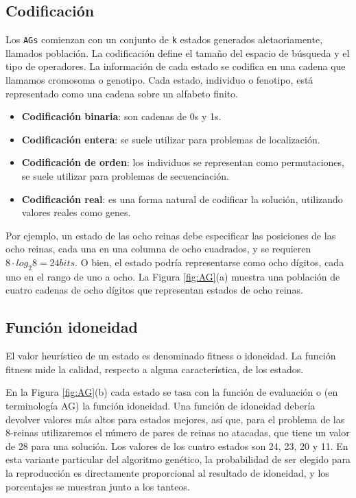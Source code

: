 	\subsection{Codificación}
	\par Los \texttt{AGs} comienzan con un conjunto de \texttt{k} estados generados aletaoriamente, llamados población. 
	La codificación define el tamaño del espacio de búsqueda y el tipo de operadores. La información de cada
	estado se codifica en una cadena que llamamos cromosoma o genotipo. 
	Cada estado, individuo o fenotipo, está representado como una cadena sobre un alfabeto finito. 
	\newpage
	\begin{itemize}
		\item \textbf{Codificación binaria}: son cadenas de 0s y 1s.
		\item \textbf{Codificación entera}: se suele utilizar para problemas de localización.
		\item \textbf{Codificación de orden}: los individuos se representan como permutaciones, se suele utilizar para problemas de secuenciación.
		\item \textbf{Codificación real}: es una forma natural de codificar la solución, utilizando valores reales como genes.
	\end{itemize}
	Por ejemplo, un estado de las ocho reinas debe especificar las posiciones de las ocho reinas, cada una en una columna de ocho 
	cuadrados, y se requieren $8 \cdot log_2 8 = 24 bits$. O bien, el estado podría representarse como ocho dígitos, cada uno en el rango 
	de uno a ocho. La Figura \ref{fig:AG}(a) muestra una población de cuatro cadenas de ocho dígitos que representan estados de ocho reinas.
	
	\subsection{Función idoneidad}
	\par El valor heurístico de un estado es denominado fitness o idoneidad. La función fitness mide la calidad, respecto a alguna 
	característica, de los estados.
	\par En la Figura \ref{fig:AG}(b) cada estado se tasa con la función de evaluación o (en terminología AG) la función idoneidad. 
	Una función de idoneidad debería devolver valores más altos para estados mejores, así que, para el problema de las 8-reinas 
	utilizaremos el número de pares de reinas no atacadas, que tiene un valor de 28 para una solución. Los valores de los cuatro 
	estados son 24, 23, 20 y 11. En esta variante particular del algoritmo genético, la probabilidad de ser elegido para la reproducción
	 es directamente proporcional al resultado de idoneidad, y los porcentajes se muestran junto a los tanteos.

